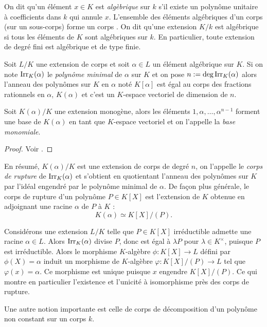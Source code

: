 \documentclass[a4paper]{article} %
\numberwithin{section}{part}
\numberwithin{equation}{section}
\newcommand\Irr[2]{\textup{Irr}_{#1}(#2)}
\begin{document}
On dit qu'un élément $x\in K$ est \emph{algèbrique} sur $k$ s'il existe un 
polynôme unitaire à coefficients dans $k$ qui annule $x$. L'ensemble des 
éléments algébriques d'un corps (sur un sous-corps) forme un corps \cite[p.~64, 
théorème 1.14]{Per}. On dit qu'une extension $K/k$ est algébrique si tous les 
éléments de $K$ sont algébriques sur $k$. En particulier, toute extension de
degré fini est algébrique et de type finie.

Soit $L/K$ une extension de corps et soit $\alpha\in L$ un élément algébrique 
sur $K$. Si on note $\Irr{K}{\alpha}$ le \emph{polynôme minimal} de $\alpha$ sur
$K$ et on pose $n := \textup{deg\,}\Irr{K}{\alpha}$ alors l'anneau des polynômes
sur $K$ en $\alpha$ noté $K[\alpha]$ est égal au corps des fractions rationnels
en $\alpha$, $K(\alpha)$ et c'est un $K$-espace vectoriel de dimension de $n$.
\begin{defnp}
Soit $K(\alpha)/K$ une extension monogène, alors les éléments 
$1,\alpha,\dots,\alpha^{n-1}$ forment une base de $K(\alpha)$ en tant que
$K$-espace vectoriel et on l'appelle la \emph{base monomiale}.
\end{defnp}
\begin{proof}
Voir \cite[III, th. 1.11]{Per}.
\end{proof}

En résumé, $K(\alpha)/K$ est une extension de corps de
degré $n$, on l'appelle le \emph{corps de rupture} de $\Irr{K}{\alpha}$ et
s'obtient en quotientant l'anneau des polynômes sur $K$ par l'idéal engendré par
le polynôme minimal de $\alpha$. De façon plus générale, le corps de rupture 
d'un polynôme $P\in K[X]$ est l'extension de $K$ obtenue en adjoignant une 
racine $\alpha$ de $P$ à $K$ :
\begin{equation}
K(\alpha)\simeq K[X]/(P).
\end{equation}

Considérons une extension $L/K$ telle que $P\in K[X]$ irréductible admette une 
racine $\alpha\in L$. Alors $\Irr{K}{\alpha}$ divise $P$, donc est égal à 
$\lambda P$ pour $\lambda\in K^{\times}$, puisque $P$ est irréductible. Alors 
le morphisme $K$-algèbre $\phi : K[X] \to L$ défini par $\phi(X) = \alpha$ 
induit un morphisme de $K$-algèbre $\varphi : K[X]/(P) \to L$ tel que 
$\varphi(x) = \alpha$. Ce morphisme est unique puisque $x$ engendre $K[X]/(P)$. 
Ce qui montre en particulier l'existence et l'unicité à isomorphisme près des 
corps de rupture.\par
\vspace{0.3cm}
Une autre notion importante est celle de corps de décomposition d'un polynôme 
non constant sur un corps $k$.
\end{document}

